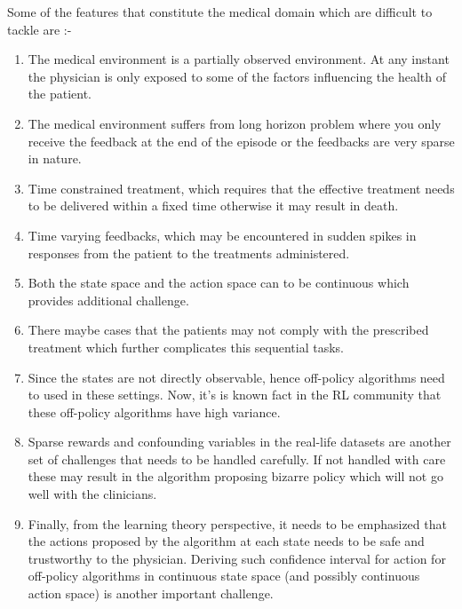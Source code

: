 Some of the features that constitute the medical domain which are difficult to tackle are :-

\begin{enumerate}
\item The medical environment is a partially observed environment. At any instant the physician is only exposed to some of the factors influencing the health of the patient.
\item The medical environment suffers from long horizon problem where you only receive the feedback at the end of the episode or the feedbacks are very sparse in nature.
\item Time constrained treatment, which requires that the effective treatment needs to be delivered within a fixed time otherwise it may result in death.
\item Time varying feedbacks, which may be encountered in sudden spikes in responses from the patient to the treatments administered.
\item Both the state space and the action space can to be continuous which provides additional challenge.
\item There maybe cases that the patients may not comply with the prescribed treatment which further complicates this sequential tasks.
\item Since the states are not directly observable, hence off-policy algorithms need to used in these settings. Now, it's is known fact in the RL community that these off-policy algorithms have high variance.
\item Sparse rewards and confounding variables in the real-life datasets are another set of challenges that needs to be handled carefully. If not handled with care these may result in the algorithm proposing bizarre policy which will not go well with the clinicians.
\item Finally, from the learning theory perspective, it needs to be emphasized that the actions proposed by the algorithm at each state needs to be safe and trustworthy to the physician. Deriving such confidence interval for action for off-policy algorithms in continuous state space (and possibly continuous action space) is another important challenge.
\end{enumerate}